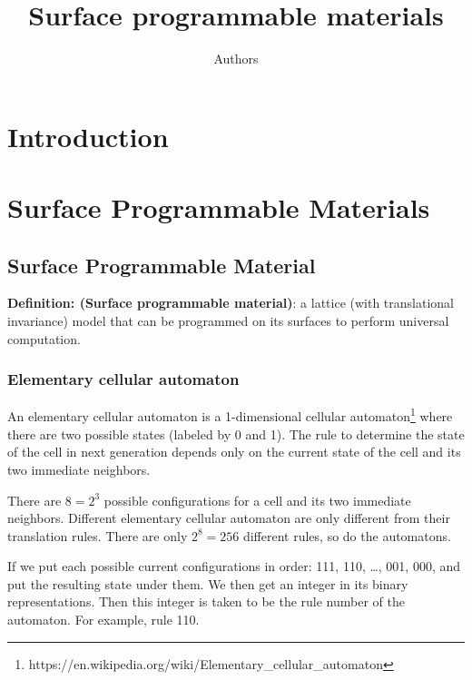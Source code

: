 \documentclass[twocolumn,superscriptaddress,english,showpacs,longbibliography]{revtex4-2}
\begin{document}
\title{Surface programmable materials}

\author{Authors}

\begin{abstract}
\end{abstract}

\maketitle

\section{Introduction}

\section{Surface Programmable Materials}\label{surface-programmable-materials}

\subsection{Surface Programmable
Material}\label{surface-programmable-material}

\textbf{Definition: (Surface programmable material)}: a lattice (with
translational invariance) model that can be programmed on its surfaces
to perform universal computation.

\subsubsection{Elementary cellular automaton}\label{elementary-cellular-automaton}

An elementary cellular automaton is a 1-dimensional cellular
automaton\footnote{https://en.wikipedia.org/wiki/Elementary_cellular_automaton}
where there are two possible states (labeled by 0 and 1). The rule to
determine the state of the cell in next generation depends only on the
current state of the cell and its two immediate neighbors.

There are $8 = 2^3$ possible configurations for a cell and its two
immediate neighbors. Different elementary cellular automaton are only
different from their translation rules. There are only $2^8 = 256$
different rules, so do the automatons.

If we put each possible current configurations in order: 111, 110,
\ldots, 001, 000, and put the resulting state under them. We then get an
integer in its binary representations. Then this integer is taken to be
the rule number of the automaton. For example, rule 110.
\end{document}
